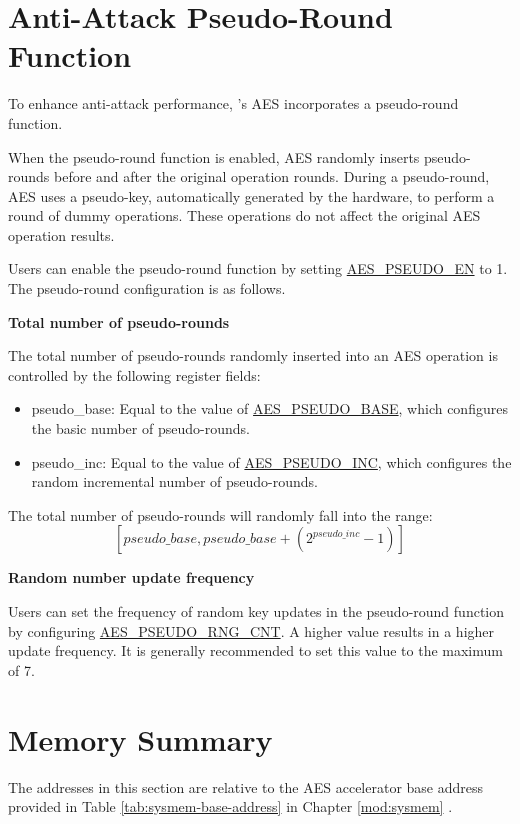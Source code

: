\documentclass[main\_\_EN.tex]{subfiles}
\begin{document}
\section{Anti-Attack Pseudo-Round Function}\label{sec:aes-pseudo-round}

To enhance anti-attack performance, \chipname{}'s AES incorporates a pseudo-round function.

When the pseudo-round function is enabled, AES randomly inserts pseudo-rounds before and after the original operation rounds. During a pseudo-round, AES uses a pseudo-key, automatically generated by the hardware, to perform a round of dummy operations. These operations do not affect the original AES operation results.

Users can enable the pseudo-round function by setting \hyperref[fielddesc:AESPSEUDOEN]{AES\_PSEUDO\_EN} to 1. The pseudo-round configuration is as follows.

\textbf{Total number of pseudo-rounds}

The total number of pseudo-rounds randomly inserted into an AES operation is controlled by the following register fields:
\begin{itemize}
    \item pseudo\_base: Equal to the value of \hyperref[fielddesc:AESPSEUDOBASE]{AES\_PSEUDO\_BASE}, which configures the basic number of pseudo-rounds.
    \item pseudo\_inc: Equal to the value of \hyperref[fielddesc:AESPSEUDOINC]{AES\_PSEUDO\_INC}, which configures the random incremental number of pseudo-rounds.
\end{itemize}

The total number of pseudo-rounds will randomly fall into the range:$$[pseudo\_base,pseudo\_base+(2^{pseudo\_inc}-1)]$$

\textbf{Random number update frequency}

Users can set the frequency of random key updates in the pseudo-round function by configuring \hyperref[fielddesc:AESPSEUDORNGCNT]{AES\_PSEUDO\_RNG\_CNT}. A higher value results in a higher update frequency. It is generally recommended to set this value to the maximum of 7.


\section{Memory Summary}\label{aesMemorySummary}

The addresses in this section are relative to the AES accelerator base address provided in Table \ref{tab:sysmem-base-address} in Chapter \ref{mod:sysmem} \textit{}.
\end{document}
